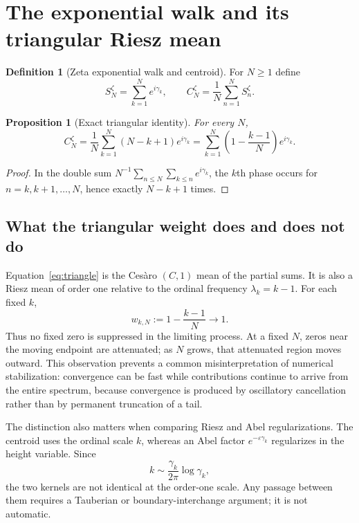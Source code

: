 \documentclass[11pt]{article}
\newtheorem{proposition}[theorem]{Proposition}
\theoremstyle{definition}
\newtheorem{definition}[theorem]{Definition}
\theoremstyle{remark}
\begin{document}
\section{The exponential walk and its triangular Riesz mean}\label{sec:riesz}

\begin{definition}[Zeta exponential walk and centroid]
For $N\ge1$ define
\[
S_N^{\zeta}=\sum_{k=1}^N e^{i\gamma_k},\qquad
C_N^{\zeta}=\frac1N\sum_{n=1}^N S_n^{\zeta}.
\]
\end{definition}

\begin{proposition}[Exact triangular identity]\label{prop:triangle}
For every $N$,
\begin{equation}\label{eq:triangle}
\boxed{
C_N^{\zeta}
=\frac1N\sum_{k=1}^N(N-k+1)e^{i\gamma_k}
=\sum_{k=1}^N\left(1-\frac{k-1}{N}\right)e^{i\gamma_k}.
}
\end{equation}
\end{proposition}
\begin{proof}
In the double sum $N^{-1}\sum_{n\le N}\sum_{k\le n}e^{i\gamma_k}$, the $k$th phase occurs for $n=k,k+1,\ldots,N$, hence exactly $N-k+1$ times.
\end{proof}

\subsection{What the triangular weight does and does not do}
Equation~\eqref{eq:triangle} is the Cesàro $(C,1)$ mean of the partial sums.  It is also a Riesz mean of order one relative to the ordinal frequency $\lambda_k=k-1$.  For each fixed $k$,
\[
w_{k,N}:=1-\frac{k-1}{N}\longrightarrow1.
\]
Thus no fixed zero is suppressed in the limiting process.  At a fixed $N$, zeros near the moving endpoint are attenuated; as $N$ grows, that attenuated region moves outward.  This observation prevents a common misinterpretation of numerical stabilization: convergence can be fast while contributions continue to arrive from the entire spectrum, because convergence is produced by oscillatory cancellation rather than by permanent truncation of a tail.

The distinction also matters when comparing Riesz and Abel regularizations.  The centroid uses the ordinal scale $k$, whereas an Abel factor $e^{-\varepsilon\gamma_k}$ regularizes in the height variable.  Since
\[
k\sim \frac{\gamma_k}{2\pi}\log\gamma_k,
\]
the two kernels are not identical at the order-one scale.  Any passage between them requires a Tauberian or boundary-interchange argument; it is not automatic.
\end{document}
